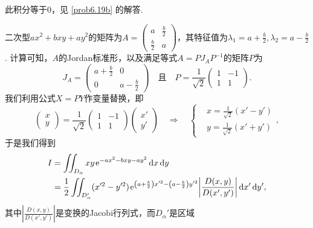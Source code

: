 \begin{solution}
  \begin{inparaenum}[(a)]
    \item 此积分等于0，见 \ref{prob6.19b} 的解答.

    \item 二次型$ax^2+bxy+ay^2$的矩阵为$A=\begin{pmatrix}
          a & \frac b2 \\
          \frac b2 & a
        \end{pmatrix}$，其特征值为$\lambda_1=a+\frac b2,\lambda_2=a-\frac b2$. 计算可知，$A$的Jordan标准形，以及满足等式$A=PJ_AP^{-1}$的矩阵$P$为
        \[
          J_A = \begin{pmatrix}
            a + \frac b2 & 0 \\
            0 & a - \frac b2
          \end{pmatrix}\quad \text{且} \quad
          P = \frac1{\sqrt2} \begin{pmatrix}
            1 & -1 \\
            1 & 1
          \end{pmatrix}.
        \]
    我们利用公式$X=PY$作变量替换，即
    \[
      \begin{pmatrix}
        x \\
        y
      \end{pmatrix} =
      \frac1{\sqrt2}
      \begin{pmatrix}
            1 & -1 \\
            1 & 1
      \end{pmatrix}
      \begin{pmatrix}
        x' \\
        y'
      \end{pmatrix} \quad \Rightarrow \quad
      \left\{
        \begin{aligned}
          & x = \frac1{\sqrt2}(x' - y') \\
          & y = \frac1{\sqrt2}(x' + y')
        \end{aligned}
      \right.,
    \]
    于是我们得到
    \begin{align*}
      I & = \iint_{D_\alpha} xy\ee^{-ax^2-bxy-ay^2} \dif x \dif y \\
      & = \frac12 \iint_{D_\alpha'} (x'^2 - y'^2)\ee^{\left(a + \frac b2\right)x'^2 -
      \left( a - \frac b2\right)y'^2}\left|
      \frac{D(x,y)}{D(x',y')}\right| \dif x' \dif y',
    \end{align*}
    其中$\left| \frac{D(x,y)}{D(x',y')} \right|$是变换的Jacobi行列式，而$D_\alpha'$是区域

\end{inparaenum}
\end{solution}
